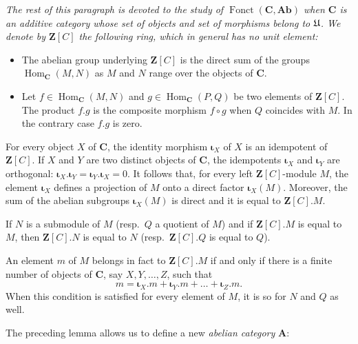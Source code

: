 {\itshape
The rest of this paragraph is devoted to the study of
$\operatorname{Fonct}(\mathbf{C},\mathbf{Ab})$ when $\mathbf{C}$ is an
additive category whose set of objects and set of morphisms belong to $\mathfrak{U}$.
We denote by $\mathbf{Z}[C]$ the following ring, which in general has no unit
element:
\par}

\begin{itemize}
\item The abelian group underlying $\mathbf{Z}[C]$ is the direct sum of the
      groups $\operatorname{Hom}_{\mathbf{C}}(M,N)$ as $M$ and $N$ range over
      the objects of $\mathbf{C}$.

\item Let $f\in\operatorname{Hom}_{\mathbf{C}}(M,N)$ and
      $g\in\operatorname{Hom}_{\mathbf{C}}(P,Q)$ be two elements of
      $\mathbf{Z}[C]$. The product $f.g$ is the composite morphism $f\circ g$
      when $Q$ coincides with $M$. In the contrary case $f.g$ is zero.
\end{itemize}

For every object $X$ of $\mathbf{C}$, the identity morphism
$\mathbf{\iota}_X$ of $X$ is an idempotent of $\mathbf{Z}[C]$. If $X$ and $Y$
are two distinct objects of $\mathbf{C}$, the idempotents
$\mathbf{\iota}_X$ and $\mathbf{\iota}_Y$ are orthogonal:
$\mathbf{\iota}_X.\mathbf{\iota}_Y = \mathbf{\iota}_Y.\mathbf{\iota}_X = 0$.
It follows that, for every left $\mathbf{Z}[C]$-module $M$, the element
$\mathbf{\iota}_X$ defines a projection of $M$ onto a direct factor
$\mathbf{\iota}_X(M)$. Moreover, the sum of the abelian subgroups
$\mathbf{\iota}_X(M)$ is direct and it is equal to $\mathbf{Z}[C].M$.

\begin{lemma}
If $N$ is a submodule of $M$ (resp.\ $Q$ a quotient of $M$) and if
$\mathbf{Z}[C].M$ is equal to $M$, then $\mathbf{Z}[C].N$ is equal to $N$
(resp.\ $\mathbf{Z}[C].Q$ is equal to $Q$).
\end{lemma}

An element $m$ of $M$ belongs in fact to $\mathbf{Z}[C].M$ if and only if
there is a finite number of objects of $\mathbf{C}$, say $X, Y, \dots, Z$,
such that
\[
  m = \mathbf{\iota}_X.m + \mathbf{\iota}_Y.m + \dots + \mathbf{\iota}_Z.m.
\]
When this condition is satisfied for every element of $M$, it is so for $N$
and $Q$ as well.

The preceding lemma allows us to define a new \emph{abelian category}
$\mathbf{A}$:


